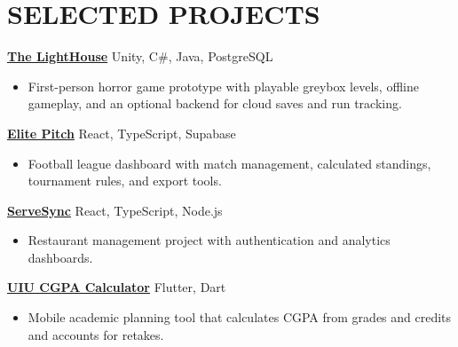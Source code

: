 \documentclass[10pt,a4paper]{article}
\begin{document}
\section*{SELECTED PROJECTS}
\textbf{\href{https://github.com/ratul1918/TheLightHouse/tree/phase-1}{The LightHouse}} \hfill Unity, C\#, Java, PostgreSQL
\begin{itemize}
  \item First-person horror game prototype with playable greybox levels, offline gameplay, and an optional backend for cloud saves and run tracking.
\end{itemize}
\vspace{3pt}
\textbf{\href{https://github.com/ratul1918/Football-Dashboard}{Elite Pitch}} \hfill React, TypeScript, Supabase
\begin{itemize}
  \item Football league dashboard with match management, calculated standings, tournament rules, and export tools.
\end{itemize}
\vspace{3pt}
\textbf{\href{https://github.com/ratul1918/ServeSync}{ServeSync}} \hfill React, TypeScript, Node.js
\begin{itemize}
  \item Restaurant management project with authentication and analytics dashboards.
\end{itemize}
\vspace{3pt}
\textbf{\href{https://github.com/ratul1918/UIU-CGPA-CALCULATOR}{UIU CGPA Calculator}} \hfill Flutter, Dart
\begin{itemize}
  \item Mobile academic planning tool that calculates CGPA from grades and credits and accounts for retakes.
\end{itemize}
\end{document}
